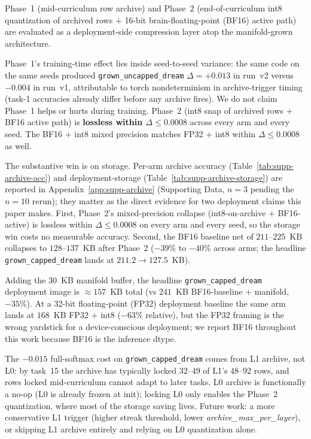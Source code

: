 \documentclass[11pt]{article}
\newcommand{\arm}[1]{\texttt{#1}}
\begin{document}
Phase~1 (mid-curriculum row archive) and Phase~2 (end-of-curriculum
int8 quantization of archived rows $+$ 16-bit brain-floating-point
(BF16) active path) are evaluated as a deployment-side compression
layer atop the manifold-grown architecture.

Phase~1's training-time effect lies inside seed-to-seed variance: the
same code on the same seeds produced \arm{grown\_uncapped\_dream}
$\Delta = +0.013$ in run~v2 versus $-0.004$ in run~v1, attributable
to torch nondeterminism in archive-trigger timing (task-1 accuracies
already differ before any archive fires). We do not claim Phase~1
helps or hurts during training. Phase~2 (int8 snap of archived rows
$+$ BF16 active path) is \textbf{lossless within $\Delta \leq 0.0008$}
across every arm and every seed. The BF16 $+$ int8 mixed precision
matches FP32 $+$ int8 within $\Delta \leq 0.0008$ as well.

The substantive win is on storage. Per-arm archive accuracy
(Table~\ref{tab:supp-archive-acc}) and deployment-storage
(Table~\ref{tab:supp-archive-storage}) are reported in
Appendix~\ref{app:supp-archive} (Supporting Data, $n = 3$ pending the
$n = 10$ rerun); they matter as the direct evidence for two
deployment claims this paper makes. First, Phase~2's mixed-precision
collapse (int8-on-archive $+$ BF16-active) is lossless within
$\Delta \leq 0.0008$ on every arm and every seed, so the storage win
costs no measurable accuracy. Second, the BF16 baseline net of
$211$--$225$~KB collapses to $128$--$137$~KB after Phase~2 ($-39\%$
to $-40\%$ across arms; the headline \arm{grown\_capped\_dream}
lands at $211.2 \to 127.5$~KB).

Adding the 30~KB manifold buffer, the headline
\arm{grown\_capped\_dream} deployment image is $\approx 157$~KB total
(vs $241$~KB BF16-baseline $+$ manifold, $-35\%$). At a 32-bit
floating-point (FP32) deployment baseline the same arm lands at
$168$~KB FP32 $+$ int8 ($-63\%$ relative), but the FP32 framing is
the wrong yardstick for a
device-conscious deployment; we report BF16 throughout this work
because BF16 is the inference dtype.

The $-0.015$ full-softmax cost on \arm{grown\_capped\_dream} comes
from L1 archive, not L0: by task~15 the archive has typically locked
$32$--$49$ of L1's $48$--$92$ rows, and rows locked mid-curriculum
cannot adapt to later tasks. L0 archive is functionally a no-op (L0
is already frozen at init); locking L0 only enables the Phase~2
quantization, where most of the storage saving lives. Future work: a
more conservative L1 trigger (higher streak threshold, lower
\textit{archive\_max\_per\_layer}), or skipping L1 archive entirely
and relying on L0 quantization alone.
\end{document}
